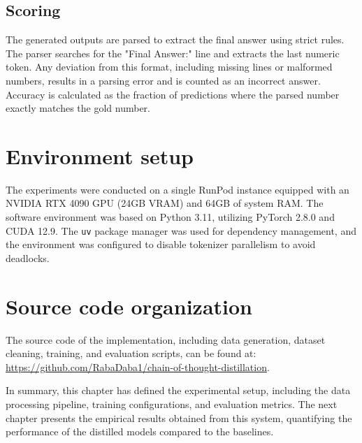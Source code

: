 \subsection{Scoring}
The generated outputs are parsed to extract the final answer using strict rules. The parser searches for the "Final Answer:" line and extracts the last numeric token. Any deviation from this format, including missing lines or malformed numbers, results in a parsing error and is counted as an incorrect answer. Accuracy is calculated as the fraction of predictions where the parsed number exactly matches the gold number.

\section{Environment setup}
The experiments were conducted on a single RunPod instance equipped with an NVIDIA RTX 4090 GPU (24GB VRAM) and 64GB of system RAM. The software environment was based on Python 3.11, utilizing PyTorch 2.8.0 and CUDA 12.9. The \texttt{uv} package manager was used for dependency management, and the environment was configured to disable tokenizer parallelism to avoid deadlocks.

\section{Source code organization}
The source code of the implementation, including data generation, dataset cleaning, training, and evaluation scripts, can be found at: \url{https://github.com/RabaDaba1/chain-of-thought-distillation}.

In summary, this chapter has defined the experimental setup, including the data processing pipeline, training configurations, and evaluation metrics. The next chapter presents the empirical results obtained from this system, quantifying the performance of the distilled models compared to the baselines.